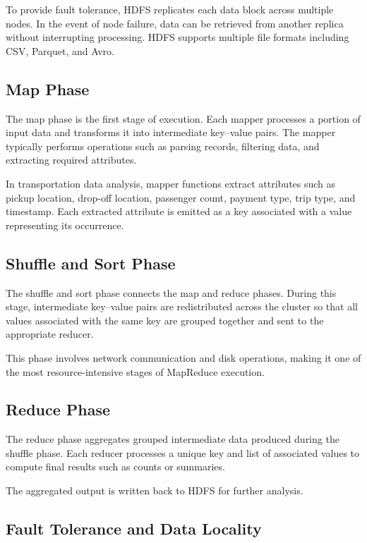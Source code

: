 \documentclass[12pt,a4paper]{report}
\begin{document}
To provide fault tolerance, HDFS replicates each data block across multiple nodes. In the
event of node failure, data can be retrieved from another replica without interrupting
processing. HDFS supports multiple file formats including CSV, Parquet, and Avro.


\subsection{Map Phase}

The map phase is the first stage of execution. Each mapper processes a portion of input
data and transforms it into intermediate key–value pairs. The mapper typically performs
operations such as parsing records, filtering data, and extracting required attributes.

In transportation data analysis, mapper functions extract attributes such as pickup
location, drop-off location, passenger count, payment type, trip type, and timestamp.
Each extracted attribute is emitted as a key associated with a value representing its
occurrence.


\subsection{Shuffle and Sort Phase}

The shuffle and sort phase connects the map and reduce phases. During this stage,
intermediate key–value pairs are redistributed across the cluster so that all values
associated with the same key are grouped together and sent to the appropriate reducer.

This phase involves network communication and disk operations, making it one of the
most resource-intensive stages of MapReduce execution.


\subsection{Reduce Phase}

The reduce phase aggregates grouped intermediate data produced during the shuffle
phase. Each reducer processes a unique key and list of associated values to compute
final results such as counts or summaries.

The aggregated output is written back to HDFS for further analysis.


\subsection{Fault Tolerance and Data Locality}
\end{document}
